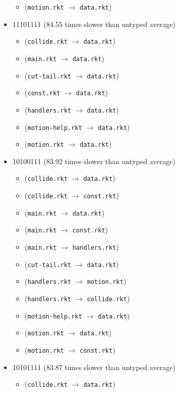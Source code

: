\documentclass{article}
\newcommand{\mono}[1]{\texttt{#1}}
\begin{document}
\begin{itemize}
\begin{itemize}
  \item (\mono{motion.rkt} $\rightarrow$ \mono{data.rkt})
  \end{itemize}
\item 11101111 (84.55 times slower than untyped average)
  \begin{itemize}
  \item (\mono{collide.rkt} $\rightarrow$ \mono{data.rkt})
  \item (\mono{main.rkt} $\rightarrow$ \mono{data.rkt})
  \item (\mono{cut-tail.rkt} $\rightarrow$ \mono{data.rkt})
  \item (\mono{const.rkt} $\rightarrow$ \mono{data.rkt})
  \item (\mono{handlers.rkt} $\rightarrow$ \mono{data.rkt})
  \item (\mono{motion-help.rkt} $\rightarrow$ \mono{data.rkt})
  \item (\mono{motion.rkt} $\rightarrow$ \mono{data.rkt})
  \end{itemize}
\item 10100111 (83.92 times slower than untyped average)
  \begin{itemize}
  \item (\mono{collide.rkt} $\rightarrow$ \mono{data.rkt})
  \item (\mono{collide.rkt} $\rightarrow$ \mono{const.rkt})
  \item (\mono{main.rkt} $\rightarrow$ \mono{data.rkt})
  \item (\mono{main.rkt} $\rightarrow$ \mono{const.rkt})
  \item (\mono{main.rkt} $\rightarrow$ \mono{handlers.rkt})
  \item (\mono{cut-tail.rkt} $\rightarrow$ \mono{data.rkt})
  \item (\mono{handlers.rkt} $\rightarrow$ \mono{motion.rkt})
  \item (\mono{handlers.rkt} $\rightarrow$ \mono{collide.rkt})
  \item (\mono{motion-help.rkt} $\rightarrow$ \mono{data.rkt})
  \item (\mono{motion.rkt} $\rightarrow$ \mono{data.rkt})
  \item (\mono{motion.rkt} $\rightarrow$ \mono{const.rkt})
  \end{itemize}
\item 10101111 (83.87 times slower than untyped average)
  \begin{itemize}
  \item (\mono{collide.rkt} $\rightarrow$ \mono{data.rkt})

\end{itemize}
\end{itemize}
\end{document}
